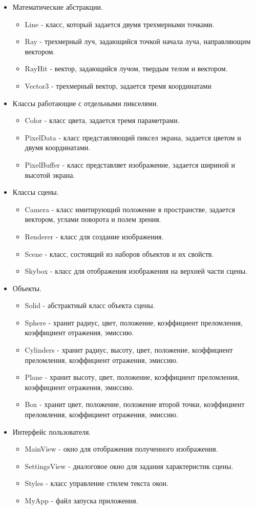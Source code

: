 \begin{itemize}
	\item Математические абстракции.
	\begin{itemize}
		\item Line -  класс, который задается двумя трехмерными точками.
		\item Ray - трехмерный луч, задающийся точкой начала луча, направляющим вектором.
		\item RayHit - вектор, задающийся лучом, твердым телом и вектором.
		\item Vector3 - трехмерный вектор, задается тремя координатами 
	\end{itemize}
	\item Классы работающие с отдельными пикселями.
	\begin{itemize}
		\item Color - класс цвета, задается тремя параметрами.
		\item PixelData - класс представляющий пиксел экрана, задается цветом и двумя координатами.
		\item PixelBuffer - класс представляет изображение, задается шириной и высотой экрана.
	\end{itemize}
	\item Классы сцены.
	\begin{itemize}
		\item Camera - класс имитирующий положение в пространстве, задается вектором, углами поворота и полем зрения.
		\item Renderer - класс для создание изображения.
		\item Scene - класс, состоящий из наборов объектов и их свойств.
		\item Skybox - класс для отображения изображения на верхней части сцены.
	\end{itemize}
	\item Объекты.
	\begin{itemize}
		\item Solid - абстрактный класс объекта сцены.
		\item Sphere - хранит радиус, цвет, положение, коэффициент преломления, коэффициент отражения, эмиссию.
		\item Cylinders - хранит радиус, высоту, цвет, положение, коэффициент преломления, коэффициент отражения, эмиссию.
		\item Plane - хранит высоту, цвет, положение, коэффициент преломления, коэффициент отражения, эмиссию.
		\item Box - хранит цвет, положение, положение второй точки, коэффициент преломления, коэффициент отражения, эмиссию.
	\end{itemize}
	\item Интерфейс пользователя.
	\begin{itemize}
		\item MainView -  окно для отображения полученного изображения.
		\item SettingsView - диалоговое окно для задания характеристик сцены.
		\item Styles - класс управление стилем текста окон.
		\item MyApp - файл запуска приложения.
	\end{itemize}


\end{itemize}
